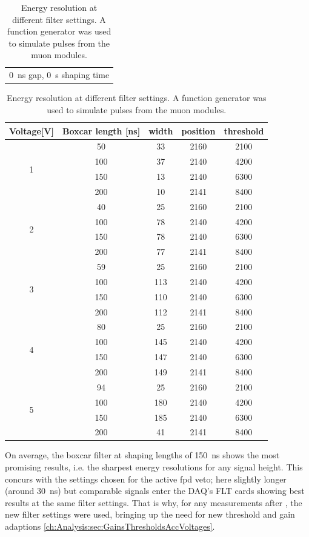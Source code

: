   \begin{table}
	\begin{tabular}{c}
	\SI{0}{\nano\second} gap, \SI{0}{\second} shaping time\\
	\end{tabular}
  	\begin{tabular}{|c|c|c|c|c|}
  		\hline
  		Voltage[V] & Boxcar length [ns] & width & position & threshold\\
  		\hline
  		\multirow{4}{*}{1} & 50 & 33 & 2160 & 2100\\
  		 & 100 & 37 & 2140 & 4200\\
  		 & 150 & 13 & 2140 & 6300\\
  		 & 200 & 10 & 2141 & 8400\\
  		 \hline
  		 \multirow{4}{*}{2} & 40 & 25 & 2160 & 2100\\
  		 & 100 & 78 & 2140 & 4200\\
  		 & 150 & 78 & 2140 & 6300\\
  		 & 200 & 77 & 2141 & 8400\\
  		 \hline
  		 \multirow{4}{*}{3} & 59 & 25 & 2160 & 2100\\
  		 & 100 & 113 & 2140 & 4200\\
  		 & 150 & 110 & 2140 & 6300\\
  		 & 200 & 112 & 2141 & 8400\\
  		 \hline
  		 \multirow{4}{*}{4} & 80 & 25 & 2160 & 2100\\
  		 & 100 & 145 & 2140 & 4200\\
  		 & 150 & 147 & 2140 & 6300\\
  		 & 200 & 149 & 2141 & 8400\\
  		 \hline
  		 \multirow{4}{*}{5} & 94 & 25 & 2160 & 2100\\
  		 & 100 & 180 & 2140 & 4200\\
  		 & 150 & 185 & 2140 & 6300\\
  		 & 200 & 41 & 2141 & 8400\\
  		 \hline	
  	\end{tabular}
  \caption[Energy resolution dependant on filter setting]{Energy resolution at different filter settings. A function generator was used to simulate pulses from the muon modules.}
	\centering
  \end{table}
  
  On average, the boxcar filter at shaping lengths of \SI{150}{\nano\second} shows the most promising results, i.e. the sharpest energy resolutions for any signal height. This concurs with the settings chosen for the active fpd veto; here slightly longer (around \SI{30}{\nano\second}) but comparable signals enter the DAQ's FLT cards showing best results at the same filter settings\cite{KevinWierman}.
  That is why, for any measurements after , the new filter settings were used, bringing up the need for new threshold and gain adaptions \ref{ch:Analysis:sec:GainsThresholdsAccVoltages}. 
  
